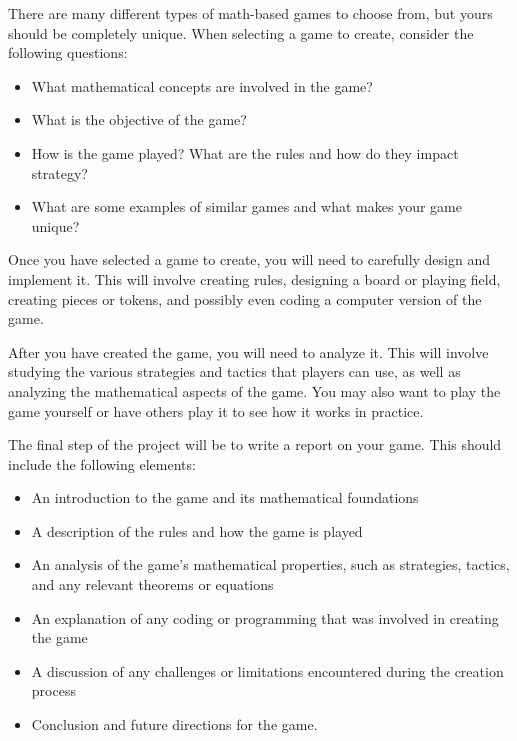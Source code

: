 \documentclass{article}
\newcounter{counter}
\begin{document}
\vspace{3mm}
There are many different types of math-based games to choose from, but yours should be completely unique. When selecting a game to create, consider the following questions:

\begin{itemize}
\item What mathematical concepts are involved in the game?
\item What is the objective of the game?
\item How is the game played? What are the rules and how do they impact strategy?
\item What are some examples of similar games and what makes your game unique?
\end{itemize}

\vspace{3mm}
Once you have selected a game to create, you will need to carefully design and implement it. This will involve creating rules, designing a board or playing field, creating pieces or tokens, and possibly even coding a computer version of the game.

\vspace{3mm}
After you have created the game, you will need to analyze it. This will involve studying the various strategies and tactics that players can use, as well as analyzing the mathematical aspects of the game. You may also want to play the game yourself or have others play it to see how it works in practice.

\vspace{3mm}
The final step of the project will be to write a report on your game. This should include the following elements:

\begin{itemize}
\item An introduction to the game and its mathematical foundations
\item A description of the rules and how the game is played
\item An analysis of the game's mathematical properties, such as strategies, tactics, and any relevant theorems or equations
\item An explanation of any coding or programming that was involved in creating the game
\item A discussion of any challenges or limitations encountered during the creation process
\item Conclusion and future directions for the game.
\end{itemize}
\end{document}
